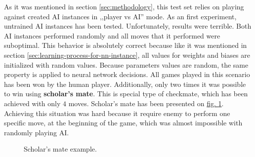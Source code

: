 As it was mentioned in section \ref{sec:methodology}, this test set relies on playing against created AI instances in ,,player vs AI'' mode. As an first experiment, untrained AI instances has been tested. Unfortunately, results were terrible. Both AI instances performed randomly and all moves that it performed were suboptimal. This behavior is absolutely correct because like it was mentioned in section \ref{sec:learning-process-for-nn-instance}, all values for weights and biases are initialized with random values. Because parameters values are random, the same property is applied to neural network decisions. All games played in this scenario has been won by the human player. Additionally, only two times it was possible to win using \textbf{scholar's mate}. This is special type of checkmate, which has been achieved with only $4$ moves. Scholar's mate has been presented on \hyperref[fig:scholars-mate]{fig. \ref*{fig:scholars-mate}}. Achieving this situation was hard because it require enemy to perform one specific move, at the beginning of the game, which was almost impossible with randomly playing AI.
\begin{figure}
    \centering
    \newchessgame
    \showboard
    \caption{Scholar's mate example.}
    \label{fig:scholars-mate}
\end{figure}

